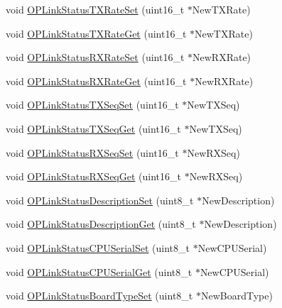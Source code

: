 \begin{DoxyCompactItemize}
\item 
void \hyperlink{group___o_p_link_status_ga72d57c5180588e657c94784b3f64ef76}{\-O\-P\-Link\-Status\-T\-X\-Rate\-Set} (uint16\-\_\-t $\ast$\-New\-T\-X\-Rate)
\item 
void \hyperlink{group___o_p_link_status_gadc3c8815e9f2833fd25d064acf3c21b8}{\-O\-P\-Link\-Status\-T\-X\-Rate\-Get} (uint16\-\_\-t $\ast$\-New\-T\-X\-Rate)
\item 
void \hyperlink{group___o_p_link_status_ga3604daeae10f38dc7d4847f4e5c56c09}{\-O\-P\-Link\-Status\-R\-X\-Rate\-Set} (uint16\-\_\-t $\ast$\-New\-R\-X\-Rate)
\item 
void \hyperlink{group___o_p_link_status_ga9b874dafc42586dba7b8419c0e0319d2}{\-O\-P\-Link\-Status\-R\-X\-Rate\-Get} (uint16\-\_\-t $\ast$\-New\-R\-X\-Rate)
\item 
void \hyperlink{group___o_p_link_status_gaaa2a3cf4822d50631d3c682ca5c49643}{\-O\-P\-Link\-Status\-T\-X\-Seq\-Set} (uint16\-\_\-t $\ast$\-New\-T\-X\-Seq)
\item 
void \hyperlink{group___o_p_link_status_ga867c9834ac94b8098b67d3bbee1b183a}{\-O\-P\-Link\-Status\-T\-X\-Seq\-Get} (uint16\-\_\-t $\ast$\-New\-T\-X\-Seq)
\item 
void \hyperlink{group___o_p_link_status_gaa59c67c31a44ff7f9f20432eda466a83}{\-O\-P\-Link\-Status\-R\-X\-Seq\-Set} (uint16\-\_\-t $\ast$\-New\-R\-X\-Seq)
\item 
void \hyperlink{group___o_p_link_status_gaa92adc409fc0fc288d3cd3916ee80b23}{\-O\-P\-Link\-Status\-R\-X\-Seq\-Get} (uint16\-\_\-t $\ast$\-New\-R\-X\-Seq)
\item 
void \hyperlink{group___o_p_link_status_ga7bd1ba819b830195cf8d045e7f9ee7e6}{\-O\-P\-Link\-Status\-Description\-Set} (uint8\-\_\-t $\ast$\-New\-Description)
\item 
void \hyperlink{group___o_p_link_status_gae6edcde267f65c3b5f8cf659a16bf8ad}{\-O\-P\-Link\-Status\-Description\-Get} (uint8\-\_\-t $\ast$\-New\-Description)
\item 
void \hyperlink{group___o_p_link_status_gad8d93f770f36aeb48239d58713eca64a}{\-O\-P\-Link\-Status\-C\-P\-U\-Serial\-Set} (uint8\-\_\-t $\ast$\-New\-C\-P\-U\-Serial)
\item 
void \hyperlink{group___o_p_link_status_gaf498f80bcba65931fc3af94720ea0843}{\-O\-P\-Link\-Status\-C\-P\-U\-Serial\-Get} (uint8\-\_\-t $\ast$\-New\-C\-P\-U\-Serial)
\item 
void \hyperlink{group___o_p_link_status_gacbf766c917205c6108bcfdea3715324c}{\-O\-P\-Link\-Status\-Board\-Type\-Set} (uint8\-\_\-t $\ast$\-New\-Board\-Type)

\end{DoxyCompactItemize}
